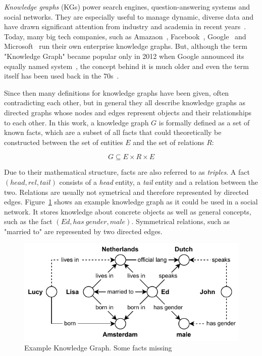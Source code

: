 \emph{Knowledge graphs} (KGs) power search engines, question-answering systems and social networks. They are especially useful to manage dynamic, diverse data and have drawn significant attention from industry and academia in recent years~\cite{}. Today, many big tech companies, such as Amazaon~\cite{AmazonKG}, Facebook~\cite{}, Google~\cite{} and Microsoft~\cite{MicrosoftKG} run their own enterprise knowledge graphs. But, although the term "Knowledge Graph" became popular only in 2012 when Google announced its equally named system~\cite{}, the concept behind it is much older and even the term itself has been used back in the 70s~\cite{}.

Since then many definitions for knowledge graphs have been given, often contradicting each other, but in general they all describe knowledge graphs as directed graphs whose nodes and edges represent objects and their relationships to each other. In this work, a knowledge graph $G$ is formally defined as a set of known facts, which are a subset of all facts that could theoretically be constructed between the set of entities $E$ and the set of relations $R$:

\[
    G \subseteq E \times R \times E
\]

Due to their mathematical structure, facts are also referred to as \emph{triples}. A fact $(head, rel, tail)$ consists of a \emph{head} entity, a \emph{tail} entity and a relation between the two. Relations are usually not symetrical and therefore represented by directed edges. Figure~\ref{fig:1_introduction/knowledge_graph} shows an example knowledge graph as it could be used in a social network. It stores knowledge about concrete objects as well as general concepts, such as the fact $(Ed, has~gender, male)$. Symmetrical relations, such as "married to" are represented by two directed edges.

\begin{figure}[t]
    \centering
    \includegraphics[]{1_introduction/knowledge_graph}
    \caption{Example Knowledge Graph. Some facts missing}
    \label{fig:1_introduction/knowledge_graph}
\end{figure}

